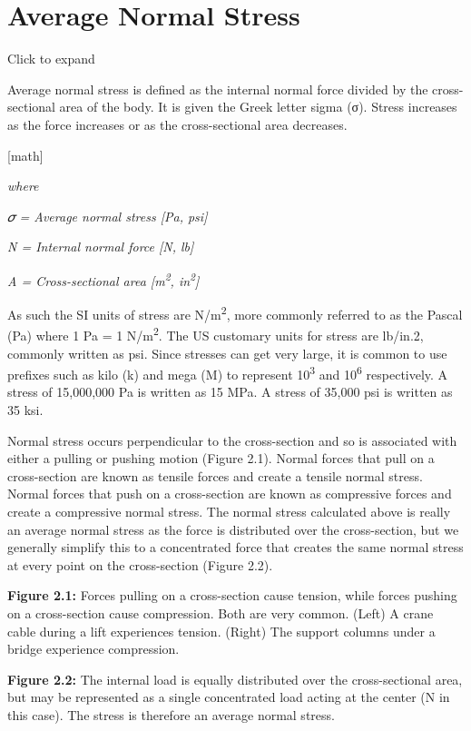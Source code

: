 \documentclass[
  letterpaper,
  DIV=11,
  numbers=noendperiod]{scrreprt}
\begin{document}
\section{Average Normal Stress}\label{average-normal-stress}

Click to expand

Average normal stress is defined as the internal normal force divided by
the cross-sectional area of the body. It is given the Greek letter sigma
(σ). Stress increases as the force increases or as the cross-sectional
area decreases.

{[}math{]}

\emph{where}

\emph{𝜎 = Average normal stress {[}Pa, psi{]}}

\emph{N = Internal normal force {[}N, lb{]}}

\emph{A = Cross-sectional area {[}m\textsuperscript{2},
in\textsuperscript{2}{]}}

As such the SI units of stress are N/m\textsuperscript{2}, more commonly
referred to as the Pascal (Pa) where 1 Pa = 1 N/m\textsuperscript{2}.
The US customary units for stress are lb/in.2, commonly written as psi.
Since stresses can get very large, it is common to use prefixes such as
kilo (k) and mega (M) to represent 10\textsuperscript{3} and
10\textsuperscript{6} respectively. A stress of 15,000,000 Pa is written
as 15 MPa. A stress of 35,000 psi is written as 35 ksi.

Normal stress occurs perpendicular to the cross-section and so is
associated with either a pulling or pushing motion (Figure 2.1). Normal
forces that pull on a cross-section are known as tensile forces and
create a tensile normal stress. Normal forces that push on a
cross-section are known as compressive forces and create a compressive
normal stress. The normal stress calculated above is really an average
normal stress as the force is distributed over the cross-section, but we
generally simplify this to a concentrated force that creates the same
normal stress at every point on the cross-section (Figure 2.2).

\textbf{Figure 2.1:} Forces pulling on a cross-section cause tension,
while forces pushing on a cross-section cause compression. Both are very
common. (Left) A crane cable during a lift experiences tension. (Right)
The support columns under a bridge experience compression.

\textbf{Figure 2.2:} The internal load is equally distributed over the
cross-sectional area, but may be represented as a single concentrated
load acting at the center (N in this case). The stress is therefore an
average normal stress.
\end{document}
